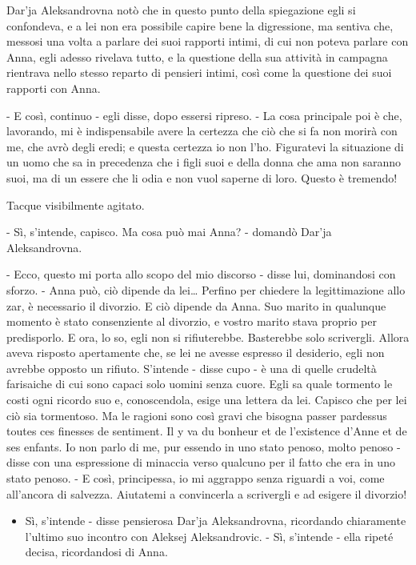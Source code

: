Dar'ja Aleksandrovna notò che in questo punto della spiegazione egli si confondeva, e a lei non era possibile capire bene la digressione, ma sentiva che, messosi una volta a parlare dei suoi rapporti intimi, di cui non poteva parlare con Anna, egli adesso rivelava tutto, e la questione della sua attività in campagna rientrava nello stesso reparto di pensieri intimi, così come la questione dei suoi rapporti con Anna. 

- E così, continuo - egli disse, dopo essersi ripreso. - La cosa principale poi è che, lavorando, mi è indispensabile avere la certezza che ciò che si fa non morirà con me, che avrò degli eredi; e questa certezza io non l'ho. Figuratevi la situazione di un uomo che sa in precedenza che i figli suoi e della donna che ama non saranno suoi, ma di un essere che li odia e non vuol saperne di loro. Questo è tremendo! 

Tacque visibilmente agitato. 

- Sì, s'intende, capisco. Ma cosa può mai Anna? - domandò Dar'ja Aleksandrovna. 

- Ecco, questo mi porta allo scopo del mio discorso - disse lui, dominandosi con sforzo. - Anna può, ciò dipende da lei\ldots{} Perfino per chiedere la legittimazione allo zar, è necessario il divorzio. E ciò dipende da Anna. Suo marito in qualunque momento è stato consenziente al divorzio, e vostro marito stava proprio per predisporlo. E ora, lo so, egli non si rifiuterebbe. Basterebbe solo scrivergli. Allora aveva risposto apertamente che, se lei ne avesse espresso il desiderio, egli non avrebbe opposto un rifiuto. S'intende - disse cupo - è una di quelle crudeltà farisaiche di cui sono capaci solo uomini senza cuore. Egli sa quale tormento le costi ogni ricordo suo e, conoscendola, esige una lettera da lei. Capisco che per lei ciò sia tormentoso. Ma le ragioni sono così gravi che bisogna passer pardessus toutes ces finesses de sentiment. Il y va du bonheur et de l'existence d'Anne et de ses enfants. Io non parlo di me, pur essendo in uno stato penoso, molto penoso - disse con una espressione di minaccia verso qualcuno per il fatto che era in uno stato penoso. - E così, principessa, io mi aggrappo senza riguardi a voi, come all'ancora di salvezza. Aiutatemi a convincerla a scrivergli e ad esigere il divorzio! 

\begin{itemize} \itemsep1pt\parskip0pt \item Sì, s'intende - disse pensierosa Dar'ja Aleksandrovna, ricordando chiaramente l'ultimo suo incontro con Aleksej Aleksandrovic. - Sì, s'intende - ella ripeté decisa, ricordandosi di Anna. \end{itemize} 

